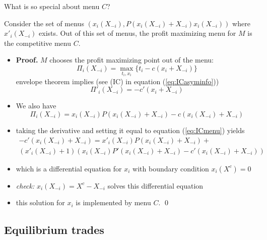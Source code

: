 \documentclass[11pt,english]{beamer}
\begin{document}
\begin{frame}[allowframebreaks]{What is so special about menu $C$?}
  \begin{lemma}
    Consider the set of menus
    $(x_i(X_{-i}),P(x_i(X_{-i})+X_{-i})x_i(X_{-i}))$ where
    $x'_i(X_{-i})$ exists. Out of this set of menus, the profit
    maximizing menu for $M$ is the competitive menu $C$.
  \end{lemma}
    \begin{itemize}
    \item \textbf{Proof.} $M$ chooses the profit maximizing point out of the menu:
      \begin{equation*}
        \Pi_i(X_{-i}) = \max_{t_i,x_i} \{t_i - c(x_i + X_{-i}) \}
      \end{equation*}
      envelope theorem implies (see (IC) in equation (\ref{eq:ICasyminfo}))
      \begin{equation}
        \label{eq:ICmenu}
        \Pi'_i(X_{-i}) = - c'(x_i+X_{-i})
      \end{equation}
    \item We also have
      \begin{equation*}
        \Pi_i(X_{-i}) = x_i(X_{-i})P(x_i(X_{-i})+X_{-i})-c(x_i(X_{-i})+X_{-i})
      \end{equation*}
    \item taking the derivative and setting it equal to equation
      (\ref{eq:ICmenu}) yields
      \begin{multline}
        -c'(x_i(X_{-i})+X_{-i})=x'_i(X_{-i})P(x_i(X_{-i})+X_{-i})+ \\
        (x'_i(X_{-i})+1)(x_i(X_{-i})P'(x_i(X_{-i})+X_{-i})-c'(x_i(X_{-i})+X_{-i}))
      \end{multline}
    \item which is a differential equation for $x_i$ with boundary
      condition $x_i(X^c)=0$
    \item \emph{check:} $x_i(X_{-i}) = X^c - X_{-i}$ solves this differential equation
    \item this solution for $x_i$ is implemented by menu $C$. \qed
    \end{itemize}
\end{frame}

\subsection{Equilibrium trades}
\end{document}
